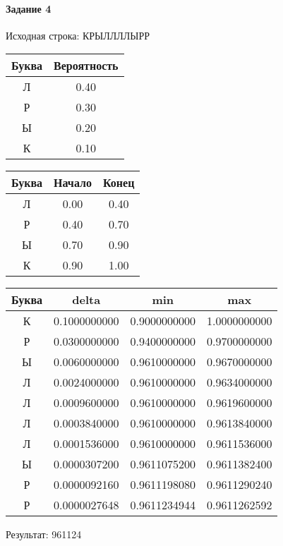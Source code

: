 \documentclass[a4paper, 12pt]{article}
\begin{document}
\paragraph{Задание 4}


Исходная строка: КРЫЛЛЛЛЫРР

\begin{center}
 \begin{tabular}{ |c|c| } 
  \hline
     Буква & Вероятность \\ \hline
Л & 0.40\\\hline
Р & 0.30\\\hline
Ы & 0.20\\\hline
К & 0.10
\\ \hline \end{tabular}
\end{center}
\begin{center}
 \begin{tabular}{ |c|c|c| } 
  \hline
     Буква & Начало & Конец \\ \hline
Л & 0.00 & 0.40\\\hline
Р & 0.40 & 0.70\\\hline
Ы & 0.70 & 0.90\\\hline
К & 0.90 & 1.00
\\ \hline \end{tabular}
\end{center}
\begin{center}
 \begin{tabular}{ |c|c|c|c| } 
  \hline
     Буква & delta & min & max \\ \hline
К & 0.1000000000 & 0.9000000000 & 1.0000000000\\\hline
Р & 0.0300000000 & 0.9400000000 & 0.9700000000\\\hline
Ы & 0.0060000000 & 0.9610000000 & 0.9670000000\\\hline
Л & 0.0024000000 & 0.9610000000 & 0.9634000000\\\hline
Л & 0.0009600000 & 0.9610000000 & 0.9619600000\\\hline
Л & 0.0003840000 & 0.9610000000 & 0.9613840000\\\hline
Л & 0.0001536000 & 0.9610000000 & 0.9611536000\\\hline
Ы & 0.0000307200 & 0.9611075200 & 0.9611382400\\\hline
Р & 0.0000092160 & 0.9611198080 & 0.9611290240\\\hline
Р & 0.0000027648 & 0.9611234944 & 0.9611262592
\\ \hline \end{tabular}
\end{center}
Результат: 961124
\pagebreak
\end{document}

